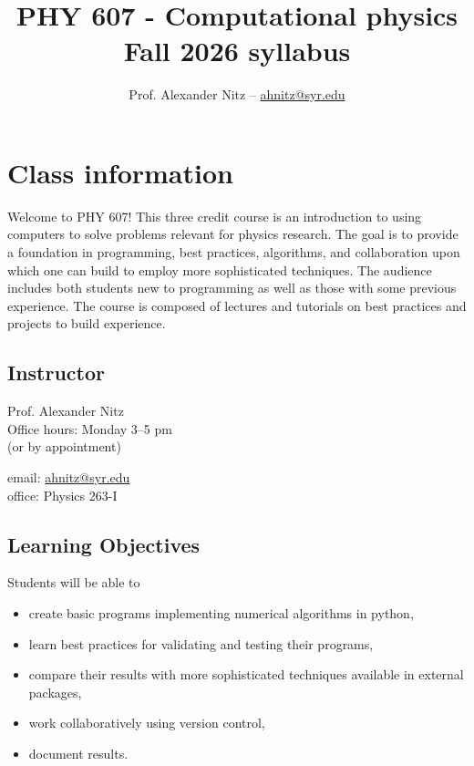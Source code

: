 \documentclass[12pt]{article}
\title{PHY 607 - Computational physics \\ Fall 2026 syllabus}
\author{Prof. Alexander Nitz -- \href{mailto:ahnitz@syr.edu}{ahnitz@syr.edu}}
\date{}
\begin{document}
\maketitle

\section*{Class information}

Welcome to PHY 607! This three credit course is an introduction to using computers to solve problems relevant for physics research. The goal is to provide a foundation in programming, best practices, algorithms, and collaboration upon which one can build to employ more sophisticated techniques. The audience includes both students new to programming as well as those with some previous experience. The course is composed of
lectures and tutorials on best practices and projects to build experience.

\subsection*{Instructor}

\noindent
\begin{minipage}[t]{0.52\textwidth}
  \raggedright
  Prof. Alexander Nitz \\
  Office hours: Monday 3--5 pm \\
  (or by appointment)
\end{minipage}%
\begin{minipage}[t]{0.46\textwidth}
  \raggedleft
  email: \href{mailto:ahnitz@syr.edu}{ahnitz@syr.edu} \\
  office: Physics 263-I
\end{minipage}

\subsection*{Learning Objectives}
Students will be able to
\begin{itemize}
\item create basic programs implementing numerical algorithms in python,
\item learn best practices for validating and testing their programs,
\item compare their results with more sophisticated techniques available in external packages,
\item work collaboratively using version control,
\item document results.
\end{itemize}
\end{document}
